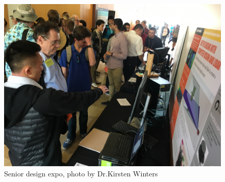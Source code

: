 \documentclass[onecolumn, draftclsnofoot,10pt, compsoc]{IEEEtran}
\makeatletter
\newcommand\captionof[1]{\def\@captype{#1}\caption}
\makeatother
\begin{document}
\begin{singlespace}
	\begin{figure}[H]
	\includegraphics[scale=0.1]{expo2.jpg}
	\captionof{figure}{Senior design expo, photo by Dr.Kirsten Winters}
	\label{expo2}
	\end{figure}

\end{singlespace}
\end{document}
